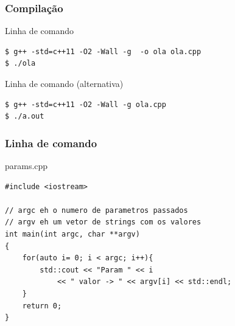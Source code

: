 \documentclass[xcolor={usenames,dvipsnames},10pt,presentation,aspectratio=169]{beamer}
\begin{document}
\begin{frame}[fragile]
  \frametitle{Compilação}
\begin{exampleblock}{Linha de comando}
\begin{lstlisting}
$ g++ -std=c++11 -O2 -Wall -g  -o ola ola.cpp
$ ./ola
\end{lstlisting}
\end{exampleblock}
%
\begin{exampleblock}{Linha de comando (alternativa)}
\begin{lstlisting}
$ g++ -std=c++11 -O2 -Wall -g ola.cpp
$ ./a.out
\end{lstlisting}
\end{exampleblock}
\end{frame}
\begin{frame}[fragile]
  \frametitle{Linha de comando}
  \begin{block}{params.cpp}
\begin{lstlisting}
#include <iostream>

// argc eh o numero de parametros passados
// argv eh um vetor de strings com os valores
int main(int argc, char **argv)
{
    for(auto i= 0; i < argc; i++){
        std::cout << "Param " << i
            << " valor -> " << argv[i] << std::endl;
    }
    return 0;
}
\end{lstlisting}
  \end{block}
\end{frame}
\end{document}
